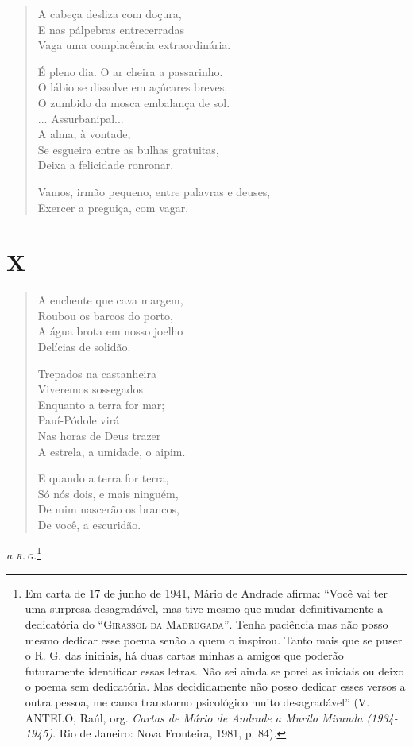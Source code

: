 \begin{verse}
A cabeça desliza com doçura,\\
E nas pálpebras entrecerradas\\
Vaga uma complacência extraordinária.

É pleno dia. O ar cheira a passarinho.\\
O lábio se dissolve em açúcares breves,\\
O zumbido da mosca embalança de sol.\\
... Assurbanipal...\\
A alma, à vontade,\\
Se esgueira entre as bulhas gratuitas,\\
Deixa a felicidade ronronar.

Vamos, irmão pequeno, entre palavras e deuses,\\
Exercer a preguiça, com vagar.
\end{verse}

\medskip
\section{X}

\begin{verse}
A enchente que cava margem,\\
Roubou os barcos do porto,\\
A água brota em nosso joelho\\
Delícias de solidão.

Trepados na castanheira\\
Viveremos sossegados\\
Enquanto a terra for mar;\\
Pauí-Pódole virá\\
Nas horas de Deus trazer\\
A estrela, a umidade, o aipim.

E quando a terra for terra,\\
Só nós dois, e mais ninguém,\\
De mim nascerão os brancos,\\
De você, a escuridão.
\end{verse}


\begin{flushright}
\emph{a \textsc{r.\,g.}}\footnote[*]{Em carta de 17 de junho de 1941, Mário de
  Andrade afirma: ``Você vai ter uma surpresa desagradável, mas tive
  mesmo que mudar definitivamente a dedicatória do ``\textsc{Girassol da
  Madrugada''}. Tenha paciência mas não posso mesmo dedicar esse poema
  senão a quem o inspirou. Tanto mais que se puser o R. G. das iniciais,
  há duas cartas minhas a amigos que poderão futuramente identificar
  essas letras. Não sei ainda se porei as iniciais ou deixo o poema sem
  dedicatória. Mas decididamente não posso dedicar esses versos a outra
  pessoa, me causa transtorno psicológico muito desagradável'' (V.
  ANTELO, Raúl, org. \emph{Cartas de Mário de Andrade a Murilo Miranda
  (1934-1945)}. Rio de Janeiro: Nova Fronteira, 1981, p. 84).}
\end{flushright}

